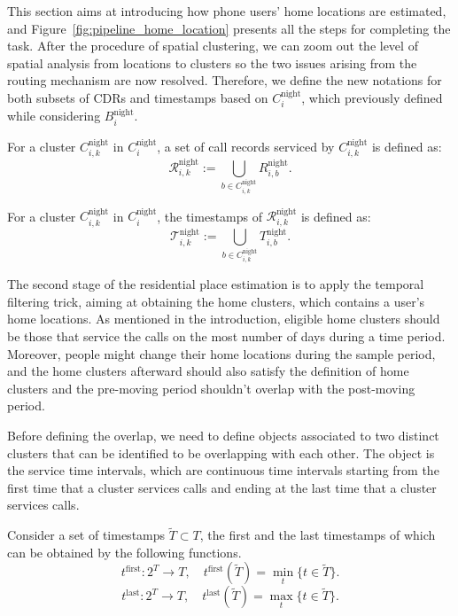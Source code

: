 This section aims at introducing how phone users' home locations are estimated, and Figure~\ref{fig:pipeline_home_location} presents all the steps for completing the task. After the procedure of spatial clustering, we can zoom out the level of spatial analysis from locations to clusters so the two issues arising from the routing mechanism are now resolved. Therefore, we define the new notations for both subsets of CDRs and timestamps based on $C^\text{night}_i$, which previously defined while considering $B^\text{night}_i$.

\begin{definition}
For a cluster $C^{\text{night}}_{i, k}$ in $C^{\text{night}}_i$, a set of call records serviced by $C^{\text{night}}_{i, k}$ is defined as:
$$
\mathcal{R}^{\text{night}}_{i, k} := \bigcup_{b \in C^{\text{night}}_{i, k}} R^{\text{night}}_{i, b}.
$$
\end{definition}

\begin{definition}
For a cluster $C^{\text{night}}_{i, k}$ in $C^{\text{night}}_i$, the timestamps of $\mathcal{R}^{\text{night}}_{i, k}$ is defined as:
$$
\mathcal{T}^{\text{night}}_{i, k} := \bigcup_{b \in C^{\text{night}}_{i, k}} T^{\text{night}}_{i, b}.
$$
\end{definition}

The second stage of the residential place estimation is to apply the temporal filtering trick, aiming at obtaining the home clusters, which contains a user's home locations. As mentioned in the introduction, eligible home clusters should be those that service the calls on the most number of days during a time period. Moreover, people might change their home locations during the sample period, and the home clusters afterward should also satisfy the definition of home clusters and the pre-moving period shouldn't overlap with the post-moving period.

Before defining the overlap, we need to define objects associated to two distinct clusters that can be identified to be overlapping with each other. The object is the service time intervals, which are continuous time intervals starting from the first time that a cluster services calls and ending at the last time that a cluster services calls.

\begin{function}
Consider a set of timestamps $\tilde{T} \subset T$, the first and the last timestamps of which can be obtained by the following functions.
$$
t^{\text{first}}: 2^{T} \rightarrow T, \quad t^{\text{first}}(\tilde{T}) = \min_t \{t \in \tilde{T}\}.
$$
$$
t^{\text{last}}: 2^{T} \rightarrow T, \quad t^{\text{last}}(\tilde{T}) = \max_t \{t \in \tilde{T}\}.
$$
\end{function}

